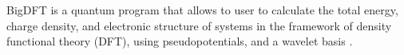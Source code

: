 BigDFT is a quantum program that allows to user to calculate the total energy, charge density, and electronic structure of systems in the framework of density functional theory (DFT), using pseudopotentials, and a wavelet basis \cite{Genovese_2008}\cite{Genovese_2008}\cite{Genovese_2008}\cite{Mohr_2014}.